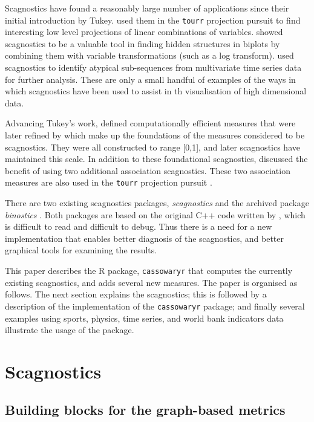 Scagnostics have found a reasonably large number of applications since
their initial introduction by Tukey. \citet{tourrpp} used them in the
\texttt{tourr} projection pursuit to find interesting low level
projections of linear combinations of variables. \citet{hidscags} showed
scagnostics to be a valuable tool in finding hidden structures in
biplots by combining them with variable transformations (such as a log
transform). \citet{timeseer} used scagnostics to identify atypical
sub-sequences from multivariate time series data for further analysis.
These are only a small handful of examples of the ways in which
scagnostics have been used to assist in th visualisation of high
dimensional data.

Advancing Tukey's work, \citet{scag} defined computationally efficient
measures that were later refined by \citet{scagdist} which make up the
foundations of the measures considered to be scagnostics. They were all
constructed to range {[}0,1{]}, and later scagnostics have maintained
this scale. In addition to these foundational scagnostics, \citet{Grimm}
discussed the benefit of using two additional association scagnostics.
These two association measures are also used in the \texttt{tourr}
projection pursuit \citep{tourrpp}.

There are two existing scagnostics packages, \emph{scagnostics}
\citep{scagdist} and the archived package \emph{binostics}
\citep{binostics}. Both packages are based on the original C++ code
written by \citet{scagdist}, which is difficult to read and difficult to
debug. Thus there is a need for a new implementation that enables better
diagnosis of the scagnostics, and better graphical tools for examining
the results.

This paper describes the R package, \texttt{cassowaryr} that computes
the currently existing scagnostics, and adds several new measures. The
paper is organised as follows. The next section explains the
scagnostics; this is followed by a description of the implementation of
the \texttt{cassowaryr} package; and finally several examples using
sports, physics, time series, and world bank indicators data illustrate
the usage of the package.

\hypertarget{scagnostics}{%
\section{Scagnostics}\label{scagnostics}}

\hypertarget{building-blocks-for-the-graph-based-metrics}{%
\subsection{Building blocks for the graph-based
metrics}\label{building-blocks-for-the-graph-based-metrics}}

